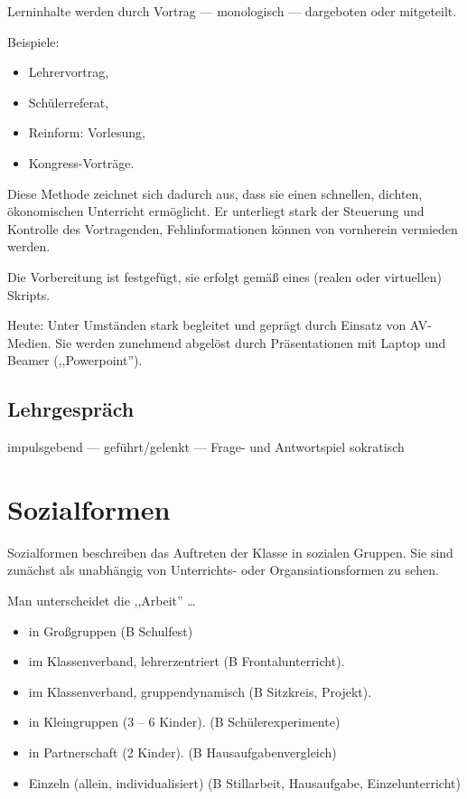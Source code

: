 Lerninhalte werden durch Vortrag --- monologisch ---
dargeboten oder mitgeteilt.

Beispiele:
\begin{itemize}
\item Lehrervortrag,
\item Sch\"{u}lerreferat,
\item Reinform: Vorlesung,
\item Kongress-Vortr\"{a}ge.
\end{itemize}

Diese Methode zeichnet sich dadurch aus, dass sie
einen schnellen, dichten, \"{o}konomischen Unterricht erm\"{o}glicht.
Er unterliegt stark der Steuerung und Kontrolle des Vortragenden,
Fehlinformationen k\"{o}nnen von vornherein vermieden werden.

\bip
Die Vorbereitung ist festgef\"{u}gt, sie erfolgt gem\"{a}{\ss} eines
(realen oder virtuellen) Skripts.

\bip
Heute: Unter Umst\"{a}nden stark begleitet und gepr\"{a}gt durch
Einsatz von AV-Medien. Sie werden zunehmend abgel\"{o}st durch
Pr\"{a}sentationen mit Laptop und Beamer (,,Powerpoint'').


\subsection{Lehrgespr\"{a}ch}
impulsgebend --- gef\"{u}hrt/gelenkt --- Frage- und Antwortspiel sokratisch


\bip\bip
\section{Sozialformen}\label{Sozial}

Sozialformen beschreiben das Auftreten der Klasse in sozialen
Gruppen.
Sie sind zun\"{a}chst als unabh\"{a}ngig von Unterrichts- oder
Organsiations\-formen zu sehen.

Man unterscheidet die ,,Arbeit'' \dots
\begin{itemize}
\item in Gro{\ss}gruppen (B Schulfest)
\item im Klassen\-verband, lehrerzentriert (B Frontalunterricht).
\item im Klassen\-verband, gruppendynamisch (B Sitzkreis, Projekt).
\item in Kleingruppen (3 -- 6 Kinder). (B Sch\"{u}lerexperimente)
\item in Partnerschaft (2 Kinder). (B Hausaufgabenvergleich)
\item Einzeln (allein, individualisiert)
(B Stillarbeit, Hausaufgabe, Einzelunterricht)
\end{itemize}

